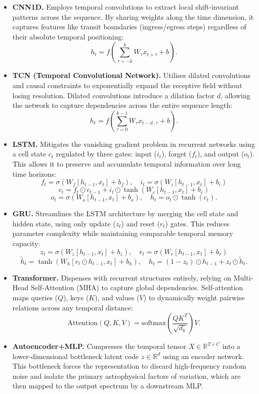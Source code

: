 \documentclass[12pt]{article}
\begin{document}
\begin{itemize}
\item \textbf{CNN1D.} Employs temporal convolutions to extract local shift-invariant patterns across the sequence. By sharing weights along the time dimension, it captures features like transit boundaries (ingress/egress steps) regardless of their absolute temporal positioning:
\[
h_t = f\left(\sum_{\tau=-k}^{k} W_\tau x_{t+\tau} + b\right).
\]
\item \textbf{TCN (Temporal Convolutional Network).} Utilises dilated convolutions and causal constraints to exponentially expand the receptive field without losing resolution. Dilated convolutions introduce a dilation factor $d$, allowing the network to capture dependencies across the entire sequence length:
\[
h_t = f\left(\sum_{\tau=0}^{k-1} W_\tau x_{t-d\cdot\tau} + b\right).
\]
\item \textbf{LSTM.} Mitigates the vanishing gradient problem in recurrent networks using a cell state $c_t$ regulated by three gates: input ($i_t$), forget ($f_t$), and output ($o_t$). This allows it to preserve and accumulate temporal information over long time horizons:
\[
f_t = \sigma(W_f [h_{t-1}, x_t] + b_f), \quad i_t = \sigma(W_i [h_{t-1}, x_t] + b_i)
\]
\[
c_t = f_t \odot c_{t-1} + i_t \odot \tanh(W_c [h_{t-1}, x_t] + b_c)
\]
\[
o_t = \sigma(W_o [h_{t-1}, x_t] + b_o), \quad h_t = o_t \odot \tanh(c_t).
\]
\item \textbf{GRU.} Streamlines the LSTM architecture by merging the cell state and hidden state, using only update ($z_t$) and reset ($r_t$) gates. This reduces parameter complexity while maintaining comparable temporal memory capacity:
\[
z_t = \sigma(W_z [h_{t-1}, x_t] + b_z), \quad r_t = \sigma(W_r [h_{t-1}, x_t] + b_r)
\]
\[
\tilde{h}_t = \tanh(W_h [r_t \odot h_{t-1}, x_t] + b_h), \quad h_t = (1 - z_t) \odot h_{t-1} + z_t \odot \tilde{h}_t.
\]
\item \textbf{Transformer.} Dispenses with recurrent structures entirely, relying on Multi-Head Self-Attention (MHA) to capture global dependencies. Self-attention maps queries ($Q$), keys ($K$), and values ($V$) to dynamically weight pairwise relations across any temporal distance:
\[
\mathrm{Attention}(Q, K, V) = \mathrm{softmax}\left(\frac{Q K^T}{\sqrt{d_k}}\right) V.
\]
\item \textbf{Autoencoder+MLP.} Compresses the temporal tensor $X \in \mathbb{R}^{T \times C}$ into a lower-dimensional bottleneck latent code $z \in \mathbb{R}^d$ using an encoder network. This bottleneck forces the representation to discard high-frequency random noise and isolate the primary astrophysical factors of variation, which are then mapped to the output spectrum by a downstream MLP.
\end{itemize}
\end{document}
